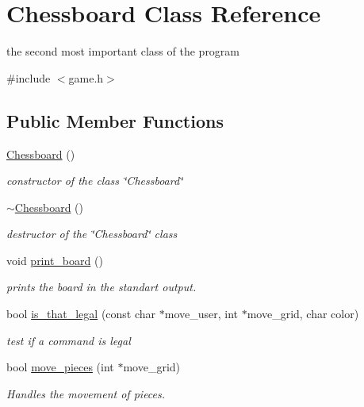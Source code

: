 \hypertarget{classChessboard}{}\section{Chessboard Class Reference}
\label{classChessboard}


the second most important class of the program  




{\ttfamily \#include $<$game.\+h$>$}

\subsection*{Public Member Functions}
\begin{DoxyCompactItemize}
\item 
\hyperlink{classChessboard_a0647fd37fc04def4958a586c3d0100ab}{Chessboard} ()
\begin{DoxyCompactList}\small\item\em constructor of the class \char`\"{}\+Chessboard\char`\"{} \end{DoxyCompactList}\item 
\hyperlink{classChessboard_a53eac522998d8d92cca409493c773f54}{$\sim$\+Chessboard} ()
\begin{DoxyCompactList}\small\item\em destructor of the \char`\"{}\+Chessboard\char`\"{} class \end{DoxyCompactList}\item 
\mbox{\label{classChessboard_a85e76d25576b8a42dd5a4edc3906dd43}} 
void \hyperlink{classChessboard_a85e76d25576b8a42dd5a4edc3906dd43}{print\+\_\+board} ()
\begin{DoxyCompactList}\small\item\em prints the board in the standart output. \end{DoxyCompactList}\item 
bool \hyperlink{classChessboard_a12ff4ac86a41d525388465e1a552fa11}{is\+\_\+that\+\_\+legal} (const char $\ast$move\+\_\+user, int $\ast$move\+\_\+grid, char color)
\begin{DoxyCompactList}\small\item\em test if a command is legal \end{DoxyCompactList}\item 
bool \hyperlink{classChessboard_a7db1f0aa2670e9183b5753386f10ac7d}{move\+\_\+pieces} (int $\ast$move\+\_\+grid)
\begin{DoxyCompactList}\small\item\em Handles the movement of pieces. \end{DoxyCompactList}\item 

\end{DoxyCompactItemize}
